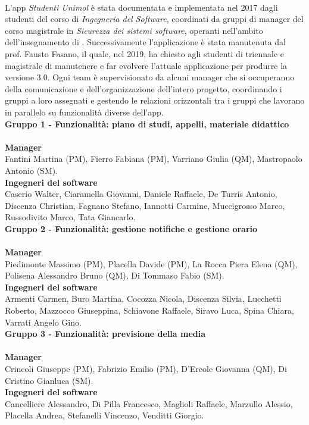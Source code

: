 \paragraph{}
L'app \textit{Studenti Unimol} è stata documentata e implementata nel 2017 dagli studenti del corso di \textit{Ingegneria del Software}, coordinati da gruppi di manager del corso magistrale in \textit{Sicurezza dei sistemi software}, operanti nell'ambito dell'insegnamento di . Successivamente l'applicazione è stata manutenuta dal prof. Fausto Fasano, il quale, nel 2019, ha chiesto agli studenti di triennale e magistrale di manutenere e far evolvere l'attuale applicazione per produrre la versione 3.0. Ogni team è supervisionato da alcuni manager che si occuperanno della comunicazione e dell'organizzazione dell'intero progetto, coordinando i gruppi a loro assegnati e gestendo le relazioni orizzontali tra i gruppi che lavorano in parallelo su funzionalità diverse dell'app. \\

\textbf {Gruppo 1 - Funzionalità: piano di studi, appelli, materiale didattico} \\ \\
\textbf{Manager} \\
Fantini Martina (PM), Fierro Fabiana (PM), Varriano Giulia (QM), Mastropaolo Antonio (SM). \\
\textbf{Ingegneri del software} \\
Caserio Walter, Ciaramella Giovanni, Daniele Raffaele, De Turris Antonio, Discenza Christian, Fagnano Stefano, Iannotti Carmine,  Muccigrosso Marco, Russodivito Marco, Tata Giancarlo. \\

\textbf{Gruppo 2 - Funzionalità: gestione notifiche e gestione orario} \\ \\
\textbf{Manager} \\
Piedimonte Massimo (PM), Placella Davide (PM), La Rocca Piera Elena (QM), Polisena Alessandro Bruno (QM), Di Tommaso Fabio (SM). \\
\textbf{Ingegneri del software} \\
Armenti Carmen, Buro Martina, Cocozza Nicola, Discenza Silvia, Lucchetti Roberto, Mazzocco Giuseppina, Schiavone Raffaele, Siravo Luca, Spina Chiara, Varrati Angelo Gino. \\

\textbf {Gruppo 3 - Funzionalità: previsione della media} \\ \\
\textbf{Manager} \\Crincoli Giuseppe (PM), Fabrizio Emilio (PM), D'Ercole Giovanna (QM), Di Cristino Gianluca (SM). \\
\textbf{Ingegneri del software} \\Cancelliere Alessandro, Di Pilla Francesco, Maglioli Raffaele, Marzullo Alessio, Placella Andrea, Stefanelli Vincenzo, Venditti Giorgio.\\

